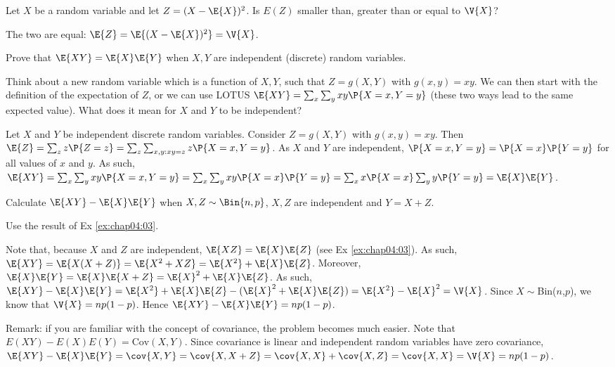 \begin{exercise}
	Let $X$ be a random variable and let $Z=(X-\E{X})^2$. Is $E(Z)$ smaller than, greater than or equal to $\V{X}$?
	\begin{solution}
		The two are equal: $\E{Z} = \E{(X-\E{X})^2} = \V{X}$.
	\end{solution}
\end{exercise}

\begin{exercise}\label{ex:chap04:03} 
	Prove that $\E{XY} = \E{X}\E{Y}$ when $X,Y$ are independent (discrete) random variables.
	\begin{hint}
		Think about a new random variable which is a function of $X,Y$, such that $Z=g(X,Y)$ with $g(x,y)=xy$. We can then start with the definition of the expectation of $Z$, or we can use LOTUS $\E{XY} = \sum_x \sum_y xy \P{X = x, Y = y}$ (these two ways lead to the same expected value). What does it mean for $X$ and $Y$ to be independent? 
	\end{hint}
	\begin{solution}
		Let $X$ and $Y$ be independent discrete random variables. Consider  $Z=g(X,Y)$ with $g(x,y)=xy$. Then $\E{Z} = \sum_z z \P{Z = z}=\sum_z \sum_{x,y:xy=z} z \P{X = x, Y=y}$. As $X$ and $Y$ are independent, $\P{X = x, Y = y} = \P{X = x}\P{Y = y}$ for all values of $x$ and $y$. As such, $\E{XY} = \sum_x \sum_y xy \P{X = x, Y = y} = \sum_x \sum_y xy \P{X = x} \P{Y = y} = \sum_x x \P{X = x} \sum_y y \P{Y = y} = \E{X} \E{Y}$.
	\end{solution}
\end{exercise}

\begin{exercise}\label{Exref{ex:chap04:03}}
	Calculate $\E{XY} - \E{X}\E{Y}$ when $X,Z\sim \Bin{n, p}$, $X,Z$ are independent and $Y = X + Z$.
	\begin{hint}
		Use the result of Ex \ref{ex:chap04:03}. 
	\end{hint}
	\begin{solution}
		Note that, because $X$ and $Z$ are independent, $\E{XZ} = \E{X} \E{Z}$ (see Ex \ref{ex:chap04:03}). As such, $\E{XY} = \E{X(X + Z)} = \E{X^2 + XZ} = \E{X^2} + \E{X} \E{Z}$. Moreover, $\E{X}\E{Y} = \E{X} \E{X + Z} = \E{X}^2 + \E{X} \E{Z}$. As such, $\E{XY} - \E{X}\E{Y} = \E{X^2} + \E{X} \E{Z} - (\E{X}^2 + \E{X} \E{Z}) = \E{X^2} - \E{X}^2 = \V{X}$. Since $X\sim$Bin($n$,$p$), we know that $\V{X} = np(1 - p)$. Hence $\E{XY} - \E{X}\E{Y} = np(1 - p)$.
	
		Remark: if you are familiar with the concept of covariance, the problem becomes much easier. Note that $E(XY) - E(X)E(Y) = \text{Cov}(X,Y)$. Since covariance is linear and independent random variables have zero covariance, $\E{XY} - \E{X}\E{Y} = \cov{X,Y} = \cov{X,X+Z} = \cov{X,X} + \cov{X,Z} = \cov{X,X} = \V{X} = np(1 - p)$.
	\end{solution}
\end{exercise}

